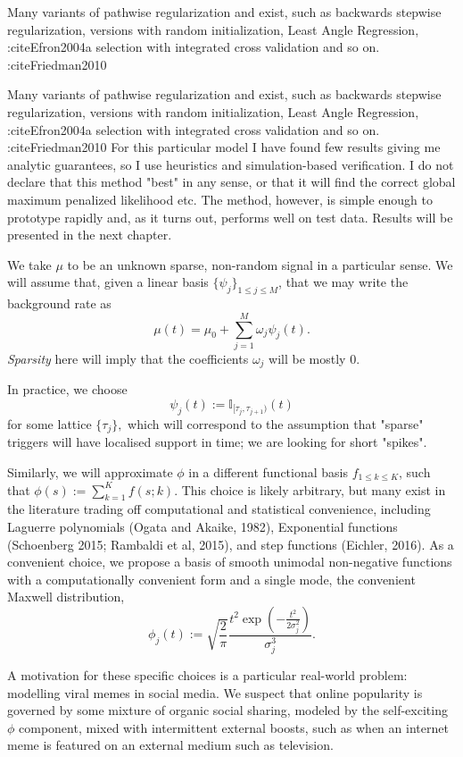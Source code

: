 \documentclass[11pt]{article}
\begin{document}
Many variants of pathwise regularization and exist, such as backwards
stepwise regularization, versions with random initialization, Least
Angle Regression, :citeEfron2004a selection with integrated cross
validation and so on. :citeFriedman2010

Many variants of pathwise regularization and exist, such as backwards
stepwise regularization, versions with random initialization, Least
Angle Regression, :citeEfron2004a selection with integrated cross
validation and so on. :citeFriedman2010 For this particular model I have
found few results giving me analytic guarantees, so I use heuristics and
simulation-based verification. I do not declare that this method "best"
in any sense, or that it will find the correct global maximum penalized
likelihood etc. The method, however, is simple enough to prototype
rapidly and, as it turns out, performs well on test data. Results will
be presented in the next chapter.

    We take $\mu$ to be an unknown sparse, non-random signal in a particular
sense. We will assume that, given a linear basis
$\{\psi_j \}_{1\leq j\leq M}$, that we may write the background rate as
\[\mu(t) = \mu_0 + \sum_{j=1}^M  \omega_j \psi_j(t).\] \emph{Sparsity}
here will imply that the coefficients $\omega_j$ will be mostly 0.

In practice, we choose
\[\psi_j(t) := \mathbb{I}_{[\tau_{j},\tau_{j+1})}(t)\] for some lattice
$\{\tau_j\},$ which will correspond to the assumption that "sparse"
triggers will have localised support in time; we are looking for short
"spikes".

Similarly, we will approximate $\phi$ in a different functional basis
${f}_{1\leq k \leq K}$, such that $\phi(s):= \sum_{k=1}^K f(s;k)$. This
choice is likely arbitrary, but many exist in the literature trading off
computational and statistical convenience, including Laguerre
polynomials (Ogata and Akaike, 1982), Exponential functions (Schoenberg
2015; Rambaldi et al, 2015), and step functions (Eichler, 2016). As a
convenient choice, we propose a basis of smooth unimodal non-negative
functions with a computationally convenient form and a single mode, the
convenient Maxwell distribution,
\[\phi_j(t):=\sqrt{\frac{2}{\pi}} \frac{t^2\exp\left(-\frac{t^2}{2\sigma_j^2}\right)}{\sigma_j^3}.\]

A motivation for these specific choices is a particular real-world
problem: modelling viral memes in social media. We suspect that online
popularity is governed by some mixture of organic social sharing,
modeled by the self-exciting $\phi$ component, mixed with intermittent
external boosts, such as when an internet meme is featured on an
external medium such as television.
\end{document}
